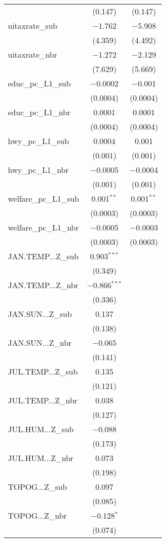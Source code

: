 \begin{table}[!htbp]
\begin{tabular}{@{\extracolsep{5pt}}lcc}
  & (0.147) & (0.147) \\ 
  uitaxrate\_sub & $-$1.762 & $-$5.908 \\ 
  & (4.359) & (4.492) \\ 
  uitaxrate\_nbr & $-$1.272 & $-$2.129 \\ 
  & (7.629) & (5.669) \\ 
  educ\_pc\_L1\_sub & $-$0.0002 & $-$0.001 \\ 
  & (0.0004) & (0.0004) \\ 
  educ\_pc\_L1\_nbr & 0.0001 & 0.0001 \\ 
  & (0.0004) & (0.0004) \\ 
  hwy\_pc\_L1\_sub & 0.0004 & 0.001 \\ 
  & (0.001) & (0.001) \\ 
  hwy\_pc\_L1\_nbr & $-$0.0005 & $-$0.0004 \\ 
  & (0.001) & (0.001) \\ 
  welfare\_pc\_L1\_sub & 0.001$^{**}$ & 0.001$^{**}$ \\ 
  & (0.0003) & (0.0003) \\ 
  welfare\_pc\_L1\_nbr & $-$0.0005 & $-$0.0003 \\ 
  & (0.0003) & (0.0003) \\ 
  JAN.TEMP...Z\_sub & 0.903$^{***}$ &  \\ 
  & (0.349) &  \\ 
  JAN.TEMP...Z\_nbr & $-$0.866$^{***}$ &  \\ 
  & (0.336) &  \\ 
  JAN.SUN...Z\_sub & 0.137 &  \\ 
  & (0.138) &  \\ 
  JAN.SUN...Z\_nbr & $-$0.065 &  \\ 
  & (0.141) &  \\ 
  JUL.TEMP...Z\_sub & 0.135 &  \\ 
  & (0.121) &  \\ 
  JUL.TEMP...Z\_nbr & 0.038 &  \\ 
  & (0.127) &  \\ 
  JUL.HUM...Z\_sub & $-$0.088 &  \\ 
  & (0.173) &  \\ 
  JUL.HUM...Z\_nbr & 0.073 &  \\ 
  & (0.198) &  \\ 
  TOPOG...Z\_sub & 0.097 &  \\ 
  & (0.085) &  \\ 
  TOPOG...Z\_nbr & $-$0.128$^{*}$ &  \\ 
  & (0.074) &  \\ 

\end{tabular}
\end{table}
